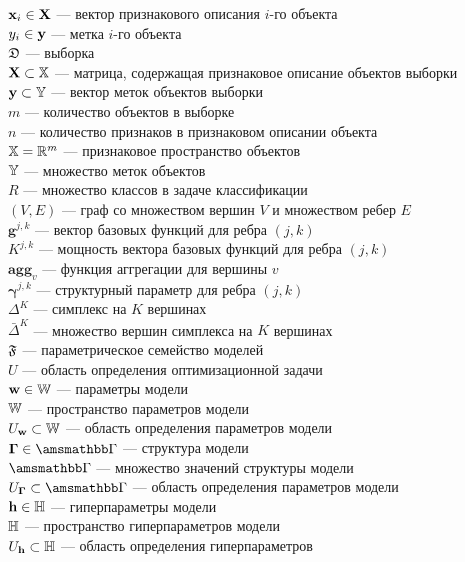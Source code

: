 \noindent$\mathbf{x}_i \in \mathbf{X}$ --- вектор признакового описания $i$-го объекта\\
$y_i \in \mathbf{y}$ --- метка $i$-го объекта\\
$\mathfrak{D}$ --- выборка\\
$\mathbf{X} \subset \mathbb{X}$ --- матрица, содержащая признаковое описание объектов выборки\\
$\mathbf{y} \subset \mathbb{Y}$ --- вектор меток объектов выборки\\
$m$ --- количество объектов в выборке\\
$n$ --- количество признаков в признаковом описании объекта\\
$\mathbb{X} = \mathbb{R}^m$ --- признаковое пространство объектов\\
$\mathbb{Y}$ --- множество меток объектов\\
$R$ --- множество классов в задаче классификации\\
$(V,E)$ --- граф со множеством вершин $V$ и множеством ребер $E$\\
$\mathbf{g}^{j,k}$ --- вектор базовых функций для ребра $(j,k)$\\
$K^{j,k}$ --- мощность вектора базовых функций для ребра $(j,k)$\\
$\textbf{agg}_v$ --- функция аггрегации для вершины $v$ \\
$\boldsymbol{\gamma}^{j,k}$ --- структурный параметр для ребра $(j,k)$\\
$\Delta^{K}$ --- симплекс на $K$ вершинах\\
$\bar{\Delta}^{K}$ --- множество вершин симплекса на $K$ вершинах\\
$\mathfrak{F}$ --- параметрическое семейство моделей\\
$U$ --- область определения оптимизационной задачи\\
$\mathbf{w} \in \mathbb{W}$ --- параметры модели\\
$\mathbb{W}$ --- пространство параметров модели\\
$U_\mathbf{w} \subset \mathbb{W}$ --- область определения параметров модели\\
$\G \in \Gb$ --- структура модели\\
$\Gb$ --- множество значений структуры модели\\
$\UG \subset \Gb$ --- область определения параметров модели\\
$\mathbf{h} \in \mathbb{H}$ --- гиперпараметры модели\\
$\mathbb{H}$ --- пространство гиперпараметров модели\\
$U_{\mathbf{h}} \subset \mathbb{H}$ --- область определения гиперпараметров\\
